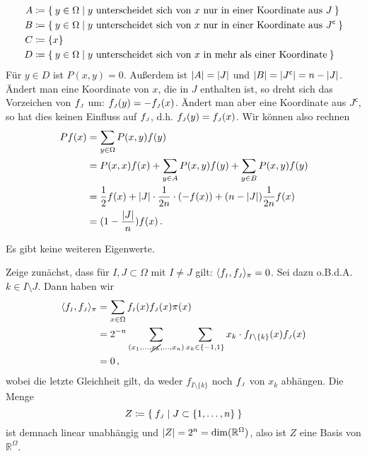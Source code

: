 \documentclass[ngerman,a4paper,11pt]{scrartcl}
\newcommand{\stcomp}[1]{{#1}^{\mathsf{c}}} %
\newcommand{\RR}{\mathbb{R}}
\DeclarePairedDelimiter{\sprod}{\langle}{\rangle}	%
\DeclarePairedDelimiter{\abs}{\lvert}{\rvert}		%
\newcommand{\smallJ}{{\mathchoice{}{}{\scriptscriptstyle}{}J}}
\newcommand{\smallI}{{\mathchoice{}{}{\scriptscriptstyle}{}I}}
\begin{document}
\begin{exmp}
\begin{dproof}
\begin{align*}
  A&\coloneqq\Set{y\in\Omega\mid\text{$y$ unterscheidet sich von $x$ nur in einer Koordinate aus $J$}} \\ 
  B&\coloneqq\Set{y\in\Omega\mid\text{$y$ unterscheidet sich von $x$ nur in einer Koordinate aus $\stcomp{J}$}} \\
  C&\coloneqq\{x\} \\
  D&\coloneqq\Set{y\in\Omega\mid\text{$y$ unterscheidet sich von $x$ in mehr als einer Koordinate}}
  \end{align*}
  Für $y\in D$ ist $P(x,y)=0$. Außerdem ist $\abs{A}=\abs{J}$ und $\abs{B}=\abs{\stcomp{J}}=n-\abs{J}$.
  Ändert man eine Koordinate von $x$, die in $J$ enthalten ist, so dreht sich
  das Vorzeichen von $f_\smallJ$ um: $f_\smallJ(y)=-f_\smallJ(x)$. Ändert man aber eine Koordinate
  aus $\stcomp{J}$, so hat dies keinen Einfluss auf $f_\smallJ$, d.h. $f_\smallJ(y)=f_\smallJ(x)$.
  Wir können also rechnen
  \begin{align*}
  Pf(x)&=\sum_{y\in\Omega}P(x,y)f(y) \\
  &=P(x,x)f(x)+\sum_{y\in A}P(x,y)f(y)+\sum_{y\in B}P(x,y)f(y) \\
  &=\frac{1}{2}f(x)+\abs{J}\cdot\frac{1}{2n}\cdot(-f(x))+(n-\abs{J})\frac{1}{2n}f(x) \\
  &=(1-\frac{\abs{J}}{n})f(x)\, .
  \end{align*}
 \end{dproof}
 \begin{claim}
  Es gibt keine weiteren Eigenwerte.
 \end{claim}
 \begin{dproof}
  Zeige zunächst, dass für $I,J\subset\Omega$ mit $I\neq J$ gilt: $\sprod{f_\smallI,f_\smallJ}_\pi=0$.
  Sei dazu o.B.d.A. $k\in I\setminus J$. Dann haben wir
  \begin{align*}
   \sprod{f_\smallI,f_\smallJ}_\pi&=\sum_{x\in\Omega}f_\smallI(x)f_\smallJ(x)\pi(x) \\
   &=2^{-n}\sum_{(x_1,\dotsc,\cancel{x_k},\dotsc,x_n)}\sum_{x_k\in\{-1,1\}}x_k\cdot f_{I\setminus\{k\}}(x)f_\smallJ(x) \\
   &=0\, ,
  \end{align*}
  wobei die letzte Gleichheit gilt, da weder $f_{I\setminus\{k\}}$ noch $f_\smallJ$ von
  $x_k$ abhängen. 
  Die Menge
  \begin{equation*}
   Z\coloneqq\Set{f_\smallJ\mid J\subset\{1,\dotsc,n\}} 
  \end{equation*}
  ist demnach linear unabhängig und $\abs{Z}=2^n=\dim(\RR^\Omega)$, also ist $Z$
  eine Basis von $\RR^\Omega$. 


\end{dproof}
\end{exmp}
\end{document}
